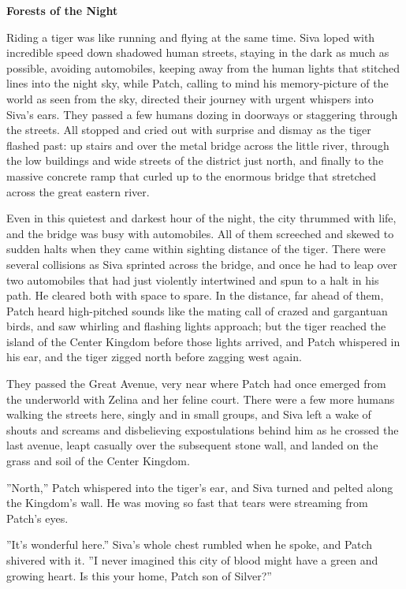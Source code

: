 \documentclass[11pt]{article}
\begin{document}
{\bf Forests of the Night\par
}\par
 Riding a tiger was like running and flying at the same time. Siva loped with incredible speed down shadowed human streets, staying in the dark as much as possible, avoiding automobiles, keeping away from the human lights that stitched lines into the night sky, while Patch, calling to mind his memory-picture of the world as seen from the sky, directed their journey with urgent whispers into Siva's ears. They passed a few humans dozing in doorways or staggering through the streets. All stopped and cried out with surprise and dismay as the tiger flashed past: up stairs and over the metal bridge across the little river, through the low buildings and wide streets of the district just north, and finally to the massive concrete ramp that curled up to the enormous bridge that stretched across the great eastern river.\par
 Even in this quietest and darkest hour of the night, the city thrummed with life, and the bridge was busy with automobiles. All of them screeched and skewed to sudden halts when they came within sighting distance of the tiger. There were several collisions as Siva sprinted across the bridge, and once he had to leap over two automobiles that had just violently intertwined and spun to a halt in his path. He cleared both with space to spare. In the distance, far ahead of them, Patch heard high-pitched sounds like the mating call of crazed and gargantuan birds, and saw whirling and flashing lights approach; but the tiger reached the island of the Center Kingdom before those lights arrived, and Patch whispered in his ear, and the tiger zigged north before zagging west again.\par
 They passed the Great Avenue, very near where Patch had once emerged from the underworld with Zelina and her feline court. There were a few more humans walking the streets here, singly and in small groups, and Siva left a wake of shouts and screams and disbelieving expostulations behind him as he crossed the last avenue, leapt casually over the subsequent stone wall, and landed on the grass and soil of the Center Kingdom.\par
 ''North,'' Patch whispered into the tiger's ear, and Siva turned and pelted along the Kingdom's wall. He was moving so fast that tears were streaming from Patch's eyes.\par
 ''It's wonderful here.'' Siva's whole chest rumbled when he spoke, and Patch shivered with it. ''I never imagined this city of blood might have a green and growing heart. Is this your home, Patch son of Silver?''\par
\end{document}
